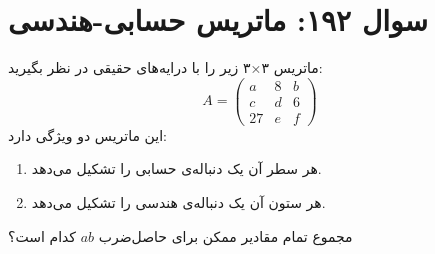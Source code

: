 \documentclass[12pt]{article}
\begin{document}
\vspace{1cm}
\hrulefill
\vspace{1cm}


\section*{سوال ۱۹۲: ماتریس حسابی-هندسی}
ماتریس ۳×۳ زیر را با درایه‌های حقیقی در نظر بگیرید:
\[ A = \begin{pmatrix} a & 8 & b \\ c & d & 6 \\ 27 & e & f \end{pmatrix} \]
این ماتریس دو ویژگی دارد:
\begin{enumerate}[label=(\roman*)]
	\item هر سطر آن یک دنباله‌ی حسابی را تشکیل می‌دهد.
	\item هر ستون آن یک دنباله‌ی هندسی را تشکیل می‌دهد.
\end{enumerate}

مجموع تمام مقادیر ممکن برای حاصل‌ضرب \(ab\) کدام است؟


\vspace{1cm}
\hrulefill
\vspace{1cm}

\end{document}

